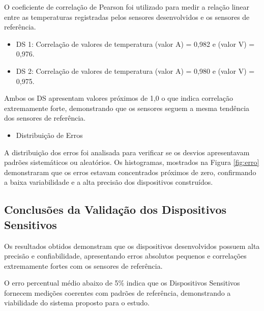 		\tab O coeficiente de correlação de Pearson foi utilizado para medir a relação linear entre as temperaturas registradas pelos sensores desenvolvidos e os sensores de referência.
		\begin{itemize}
			\item \acrshort{DS} 1: Correlação de valores de temperatura (valor A) = 0,982 e (valor V) = 0,976.
			\item \acrshort{DS} 2: Correlação de valores de temperatura (valor A) = 0,980 e (valor V) = 0,975.
		\end{itemize}
		\indent Ambos os \acrshort{DS} apresentam valores próximos de 1,0 o que indica correlação 
		extremamente forte, demonstrando que os sensores seguem a mesma tendência dos sensores de 
		referência.
	\begin{itemize}	
		\item Distribuição de Erros
	\end{itemize}
		A distribuição dos erros foi analisada para verificar se os desvios apresentavam padrões 
		sistemáticos ou aleatórios. Os histogramas, mostrados na Figura \ref{fig:erro} 
		demonstraram que os erros estavam concentrados próximos de zero, confirmando a baixa variabilidade e a alta precisão dos dispositivos construídos.


	

\subsection{Conclusões da Validação dos Dispositivos Sensitivos}
	Os resultados obtidos demonstram que os dispositivos desenvolvidos possuem alta precisão e confiabilidade, apresentando erros absolutos pequenos e correlações extremamente fortes com os sensores de referência. 
    
    O erro percentual médio abaixo de 5\% indica que os Dispositivos Sensitivos fornecem medições coerentes com padrões de referência, demonstrando a viabilidade do sistema proposto para o estudo.